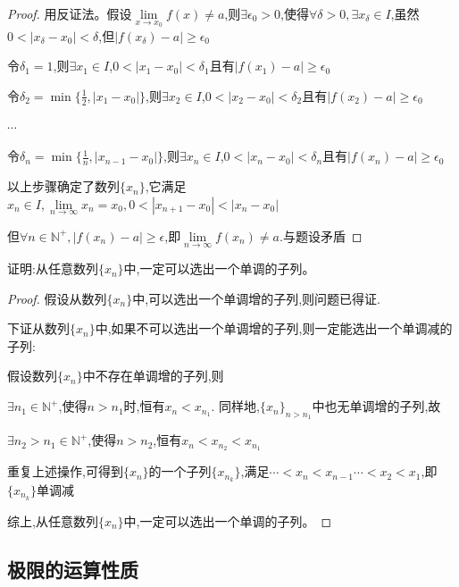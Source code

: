 \begin{proof}

    用反证法。假设$\lim \limits_{x \to x_0} f(x)\ne a$,则$\exists \epsilon_0>0$,使得$\forall \delta>0,\exists x_{\delta}\in I$,虽然$0<|x_{\delta}-x_0|<\delta$,但$|f(x_{\delta})-a|\ge \epsilon_0$

    令$\delta_1=1$,则$\exists x_1\in I$,$0<|x_1-x_0|<\delta_1 $且有$|f(x_1)-a|\ge \epsilon_0$

    令$\delta_2=\min \{\frac{1}{2},|x_1-x_0|\}$,则$\exists x_2\in I$,$0<|x_2-x_0|<\delta_2 $且有$|f(x_2)-a|\ge \epsilon_0$

    $\cdots$

    令$\delta_n=\min \{\frac{1}{n},|x_{n-1}-x_0|\}$,则$\exists x_n\in I$,$0<|x_n-x_0|<\delta_n $且有$|f(x_n)-a|\ge \epsilon_0$

    以上步骤确定了数列$\{x_n\}$,它满足$x_n\in I,\lim \limits_{n \to \infty} x_n = x_0,0<|x_{n+1}-x_0|<|x_n-x_0|$

    但$\forall n\in \mathbb{N}^+,|f(x_n)-a|\ge \epsilon$,即$\lim \limits_{n \to \infty} f(x_n) \ne a$.与题设矛盾
\end{proof}

\begin{example}
    证明:从任意数列$\{x_n\}$中,一定可以选出一个单调的子列。
\end{example}

\begin{proof}

    假设从数列$\{x_n\}$中,可以选出一个单调增的子列,则问题已得证.

    下证从数列$\{x_n\}$中,如果不可以选出一个单调增的子列,则一定能选出一个单调减的子列:

    假设数列$\{x_n\}$中不存在单调增的子列,则

    $\exists n_1 \in \mathbb{N}^+$,使得$n>n_1$时,恒有$x_n<x_{n_1}$. 同样地,$\{x_n\}_{n>n_1}$中也无单调增的子列,故

    $\exists n_2>n_1 \in \mathbb{N}^+$,使得$n>n_2$,恒有$x_n<x_{n_2}<x_{n_1}$

    重复上述操作,可得到$\{x_n\}$的一个子列$\{x_{n_k}\}$,满足$\cdots <x_n<x_{n-1}\cdots<x_2<x_1$,即$\{x_{n_k}\}$单调减

    综上,从任意数列$\{x_n\}$中,一定可以选出一个单调的子列。
\end{proof}

\vspace{-12pt}
\subsection{极限的运算性质}

